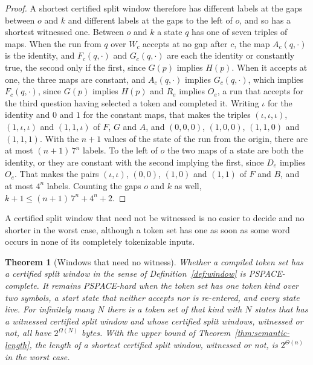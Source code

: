 \documentclass[11pt,a4paper]{article}
\theoremstyle{definition}
\theoremstyle{plain}
\newtheorem{theorem}{Theorem}
\begin{document}
\begin{proof}
A shortest certified split window therefore has different labels at the gaps between $o$ and $k$ and different labels at
the gaps to the left of $o$, and so has a shortest witnessed one. Between $o$ and $k$ a state $q$ has one of seven
triples of maps. When the run from $q$ over $W_c$ accepts at no gap after $c$, the map $A_c(q, \cdot)$ is the identity,
and $F_c(q, \cdot)$ and $G_c(q, \cdot)$ are each the identity or constantly true, the second only if the first, since
$G(p)$ implies $H(p)$. When it accepts at one, the three maps are constant, and $A_c(q, \cdot)$ implies $G_c(q, \cdot)$,
which implies $F_c(q, \cdot)$, since $G(p)$ implies $H(p)$ and $R_e$ implies $O_e$, a run that accepts for the third
question having selected a token and completed it. Writing $\iota$ for the identity and $0$ and $1$ for the constant
maps, that makes the triples $(\iota, \iota, \iota)$, $(1, \iota, \iota)$ and $(1, 1, \iota)$ of $F$, $G$ and $A$, and
$(0, 0, 0)$, $(1, 0, 0)$, $(1, 1, 0)$ and $(1, 1, 1)$. With the $n + 1$ values of the state of the run from the origin,
there are at most $(n + 1)\, 7^n$ labels. To the left of $o$ the two maps of a state are both the identity, or they are
constant with the second implying the first, since $D_e$ implies $O_e$. That makes the pairs $(\iota, \iota)$, $(0, 0)$,
$(1, 0)$ and $(1, 1)$ of $F$ and $B$, and at most $4^n$ labels. Counting the gaps $o$ and $k$ as well,
$k + 1 \leq (n + 1)\, 7^n + 4^n + 2$.
\end{proof}

A certified split window that need not be witnessed is no easier to decide and no shorter in the worst case, although a
token set has one as soon as some word occurs in none of its completely tokenizable inputs.

\begin{theorem}[Windows that need no witness]
\label{thm:plain}
Whether a compiled token set has a certified split window in the sense of Definition~\ref{def:window} is
PSPACE-complete. It remains PSPACE-hard when the token set has one token kind over two symbols, a start state that
neither accepts nor is re-entered, and every state live. For infinitely many $N$ there is a token set of that kind with
$N$ states that has a witnessed certified split window and whose certified split windows, witnessed or not, all have
$2^{\Omega(N)}$ bytes. With the upper bound of Theorem~\ref{thm:semantic-length}, the length of a shortest certified
split window, witnessed or not, is $2^{\Theta(n)}$ in the worst case.
\end{theorem}
\end{document}
